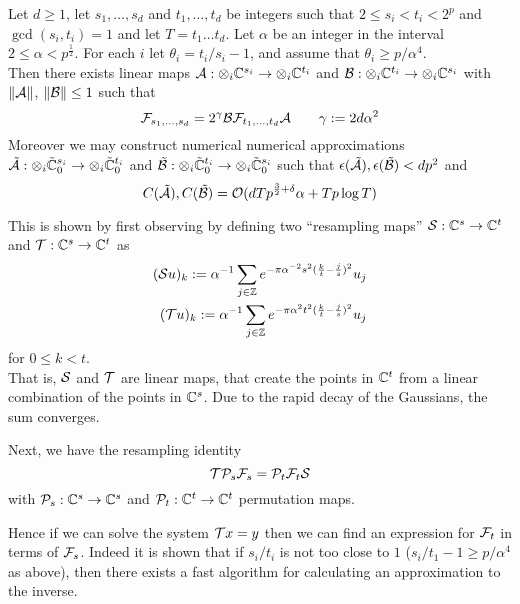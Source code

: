 \begin{theorem}
    Let $d \geq 1$, let $s_1, \ldots, s_d$ and $t_1, \ldots, t_d$ be integers such that $2 \leq s_i < t_i < 2^p$ and $\gcd(s_i, t_i) = 1$ and let $T = t_1\ldots t_d$. Let $\alpha$ be an integer in the interval $2 \leq \alpha < p^{\frac{1}{2}}$. For each $i$ let $\theta_i = t_i / s_i - 1$, and assume that $\theta_i \geq p/\alpha^4$.\\
    Then there exists linear maps $\mathcal A: \otimes_i {\mathbb C}^{s_i} \to \otimes_i {\mathbb C}^{t_i}$ and $\mathcal B: \otimes_i {\mathbb C}^{t_i} \to \otimes_i {\mathbb C}^{s_i}$ with $\|\mathcal A\|$, $\|\mathcal B\| \leq 1$ such that
    \[
        \mathcal F_{s_1, \ldots, s_d} = 2^\gamma \mathcal B \mathcal F_{t_1, \ldots, t_d} \mathcal A \qquad \gamma := 2d\alpha^2
    \]
    Moreover we may construct numerical numerical approximations $\tilde{\mathcal A}: \otimes_i \tilde{{\mathbb C}}^{s_i}_0 \to \otimes_i \tilde{{\mathbb C}}^{t_i}_0$ and $\tilde{\mathcal B}: \otimes_i \tilde{{\mathbb C}}^{t_i}_0 \to \otimes_i \tilde{{\mathbb C}}^{s_i}_0$  such that $\epsilon(\tilde{\mathcal A}), \epsilon(\tilde{\mathcal B}) < dp^2$ and
    \[
        C(\tilde{\mathcal A}), C(\tilde{\mathcal B}) = \mathcal O(dTp^{{\frac{3}{2}} + \delta}\alpha + Tp\log T)
    \]
\end{theorem}

\medskip

This is shown by first observing by defining two ``resampling maps'' $\mathcal S: {\mathbb C}^s \to {\mathbb C}^t$ and $\mathcal T: {\mathbb C}^s \to {\mathbb C}^t$ as
\begin{align*}
    (\mathcal Su)_k := \alpha^{-1} \sum_{j \in {\mathbb Z}} e^{-\pi \alpha^{-2}s^2 (\frac{k}{t} - \frac{j}{s})^2}u_j\\
    (\mathcal Tu)_k := \alpha^{-1} \sum_{j \in {\mathbb Z}} e^{-\pi \alpha^2 t^2 (\frac{k}{t} - \frac{j}{s})^2}u_j
\end{align*}
for $0 \leq k < t$.\\
That is, $\mathcal S$ and $\mathcal T$ are linear maps, that create the points in ${\mathbb C}^t$ from a linear combination of the points in ${\mathbb C}^s$. Due to the rapid decay of the Gaussians, the sum converges.

Next, we have the resampling identity
\[
  \mathcal T\mathcal P_s\mathcal F_s = \mathcal P_t\mathcal F_t\mathcal S
\]
with $\mathcal P_s: {\mathbb C}^s \to {\mathbb C}^s$ and $\mathcal P_t: {\mathbb C}^t \to {\mathbb C}^t$ permutation maps.

Hence if we can solve the system $\mathcal Tx = y$ then we can find an expression for $\mathcal F_t$ in terms of $\mathcal F_s$. Indeed it is shown that if $s_i / t_i$ is not too close to $1$ ($s_i / t_1 - 1 \geq p/\alpha^4$ as above), then there exists a fast algorithm for calculating an approximation to the inverse.

